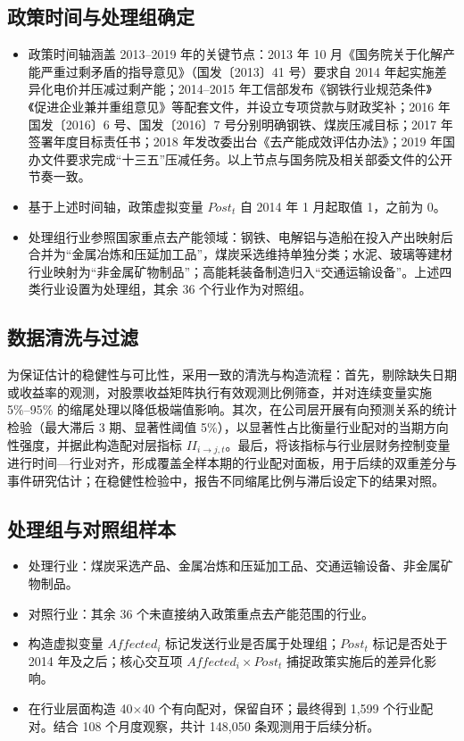 \subsection{政策时间与处理组确定}
\label{sec:policy_timeline}
\begin{itemize}
    \item 政策时间轴涵盖 2013--2019 年的关键节点：2013 年 10 月《国务院关于化解产能严重过剩矛盾的指导意见》（国发〔2013〕41 号）要求自 2014 年起实施差异化电价并压减过剩产能；2014--2015 年工信部发布《钢铁行业规范条件》《促进企业兼并重组意见》等配套文件，并设立专项贷款与财政奖补；2016 年国发〔2016〕6 号、国发〔2016〕7 号分别明确钢铁、煤炭压减目标；2017 年签署年度目标责任书；2018 年发改委出台《去产能成效评估办法》；2019 年国办文件要求完成“十三五”压减任务。以上节点与国务院及相关部委文件的公开节奏一致。
    \item 基于上述时间轴，政策虚拟变量 \(Post_t\) 自 2014 年 1 月起取值 1，之前为 0。
    \item 处理组行业参照国家重点去产能领域：钢铁、电解铝与造船在投入产出映射后合并为“金属冶炼和压延加工品”，煤炭采选维持单独分类；水泥、玻璃等建材行业映射为“非金属矿物制品”；高能耗装备制造归入“交通运输设备”。上述四类行业设置为处理组，其余 36 个行业作为对照组。
\end{itemize}

\subsection{数据清洗与过滤}
为保证估计的稳健性与可比性，采用一致的清洗与构造流程：首先，剔除缺失日期或收益率的观测，对股票收益矩阵执行有效观测比例筛查，并对连续变量实施 5\%--95\% 的缩尾处理以降低极端值影响。其次，在公司层开展有向预测关系的统计检验（最大滞后 3 期、显著性阈值 5\%），以显著性占比衡量行业配对的当期方向性强度，并据此构造配对层指标 \(II_{i\to j,t}\)。最后，将该指标与行业层财务控制变量进行时间—行业对齐，形成覆盖全样本期的行业配对面板，用于后续的双重差分与事件研究估计；在稳健性检验中，报告不同缩尾比例与滞后设定下的结果对照。
\subsection{处理组与对照组样本}
\begin{itemize}
    \item 处理行业：煤炭采选产品、金属冶炼和压延加工品、交通运输设备、非金属矿物制品。
    \item 对照行业：其余 36 个未直接纳入政策重点去产能范围的行业。
    \item 构造虚拟变量 \(Affected_i\) 标记发送行业是否属于处理组；\(Post_t\) 标记是否处于 2014 年及之后；核心交互项 \(Affected_i \times Post_t\) 捕捉政策实施后的差异化影响。
    \item 在行业层面构造 40\(\times\)40 个有向配对，保留自环；最终得到 1,599 个行业配对。结合 108 个月度观察，共计 148{,}050 条观测用于后续分析。
\end{itemize}

